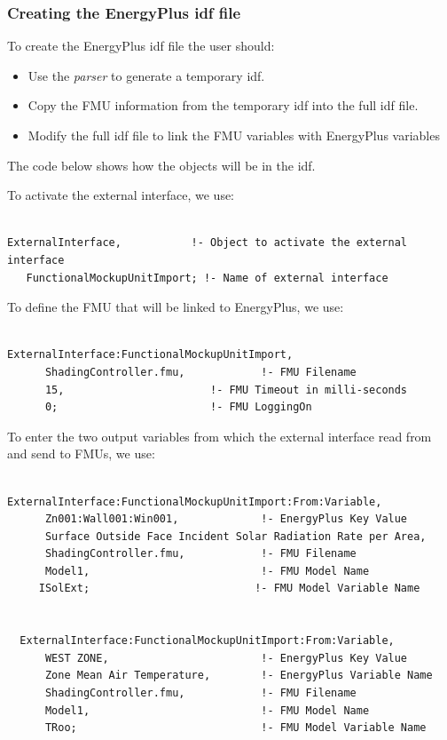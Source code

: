 \subsubsection{Creating the EnergyPlus idf file}\label{creating-the-energyplus-idf-file-1-000}

To create the EnergyPlus idf file the user should:

\begin{itemize}
\item
  Use the \emph{parser} to generate a temporary idf.
\item
  Copy the FMU information from the temporary idf into the full idf file.
\item
  Modify the full idf file to link the FMU variables with EnergyPlus variables
\end{itemize}

The code below shows how the objects will be in the idf.

To activate the external interface, we use:

\begin{lstlisting}

ExternalInterface,           !- Object to activate the external interface
   FunctionalMockupUnitImport; !- Name of external interface
\end{lstlisting}

To define the FMU that will be linked to EnergyPlus, we use:

\begin{lstlisting}

ExternalInterface:FunctionalMockupUnitImport,
      ShadingController.fmu,            !- FMU Filename
      15,                       !- FMU Timeout in milli-seconds
      0;                        !- FMU LoggingOn
\end{lstlisting}

To enter the two output variables from which the external interface read from and send to FMUs, we use:

\begin{lstlisting}

ExternalInterface:FunctionalMockupUnitImport:From:Variable,
      Zn001:Wall001:Win001,             !- EnergyPlus Key Value
      Surface Outside Face Incident Solar Radiation Rate per Area,
      ShadingController.fmu,            !- FMU Filename
      Model1,                           !- FMU Model Name
     ISolExt;                          !- FMU Model Variable Name


  ExternalInterface:FunctionalMockupUnitImport:From:Variable,
      WEST ZONE,                        !- EnergyPlus Key Value
      Zone Mean Air Temperature,        !- EnergyPlus Variable Name
      ShadingController.fmu,            !- FMU Filename
      Model1,                           !- FMU Model Name
      TRoo;                             !- FMU Model Variable Name
\end{lstlisting}

